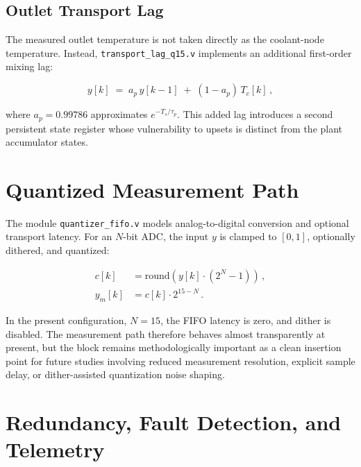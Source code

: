 \subsection{Outlet Transport Lag}
\label{ssec:bench_transport_lag}

The measured outlet temperature is not taken directly as the
coolant-node temperature.  Instead, \texttt{transport\_lag\_q15.v}
implements an additional first-order mixing lag:

\begin{equation}
  y[k] \;=\; a_p\,y[k-1] \;+\; (1-a_p)\,T_c[k] \,,
  \label{eq:transport_lag}
\end{equation}

where $a_p = 0.99786$ approximates $e^{-T_s/\tau_p}$.  This added lag
introduces a second persistent state register whose vulnerability to
upsets is distinct from the plant accumulator states.

\section{Quantized Measurement Path}
\label{sec:bench_meas}

The module \texttt{quantizer\_fifo.v} models analog-to-digital
conversion and optional transport latency.  For an $N$-bit ADC, the
input $y$ is clamped to $[0,1]$, optionally dithered, and quantized:

\begin{align}
  c[k]    &= \mathrm{round}\!\left(y[k]\cdot(2^N - 1)\right) \,, \label{eq:quant_counts} \\
  y_m[k]  &= c[k]\cdot 2^{15-N} \,. \label{eq:quant_q15}
\end{align}

In the present configuration, $N = 15$, the FIFO latency is zero, and
dither is disabled.  The measurement path therefore behaves almost
transparently at present, but the block remains methodologically
important as a clean insertion point for future studies involving
reduced measurement resolution, explicit sample delay, or
dither-assisted quantization noise shaping.

\section{Redundancy, Fault Detection, and Telemetry}
\label{sec:bench_dmr}

